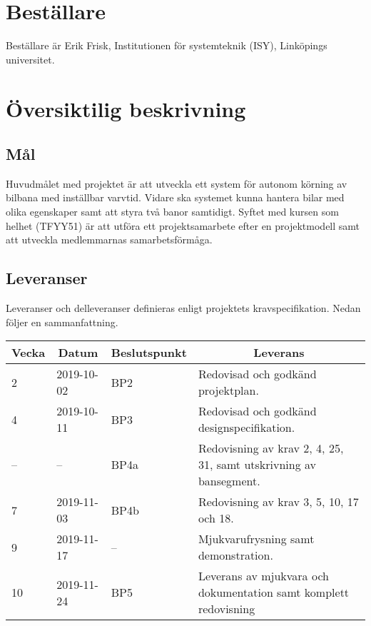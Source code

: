 \documentclass[10pt,swedish,oneside]{lips-no_customer}
\begin{document}
		\cleardoublepage
		\cfoot{\thepage}

    \section{Beställare} \label{sec:beställare}
		Beställare är Erik Frisk, Institutionen för systemteknik (ISY), Linköpings universitet.

    \section{Översiktilig beskrivning}
		\subsection{Mål}
		Huvudmålet med projektet är att utveckla ett system för autonom körning av bilbana med inställbar varvtid. Vidare ska systemet kunna hantera bilar med olika egenskaper samt att styra två banor samtidigt. Syftet med kursen som helhet (TFYY51) är att utföra ett projektsamarbete efter en projektmodell samt att utveckla medlemmarnas samarbetsförmåga.
		\subsection{Leveranser} \label{sec:leveranser}
		Leveranser och delleveranser definieras enligt projektets kravspecifikation. Nedan följer en sammanfattning. \\[1em]
		\begin{tabular}{|l|l|l|l|}
			\multicolumn{1}{c}{\bfseries Vecka} &
			\multicolumn{1}{|c}{\bfseries Datum} &
			\multicolumn{1}{|c}{\bfseries Beslutspunkt} &
			\multicolumn{1}{|c}{\bfseries Leverans} \\
			\hline
			\hline
			2 & 2019-10-02 & BP2 & Redovisad och godkänd projektplan. \\
			\hline
			4 & 2019-10-11  & BP3 & Redovisad och godkänd designspecifikation. \\
			\hline
			-- & -- & BP4a & Redovisning av krav 2, 4, 25, 31, samt utskrivning av bansegment. \\
			\hline
			7 & 2019-11-03 & BP4b & Redovisning av krav 3, 5, 10, 17 och 18. \\
			\hline
			9 & 2019-11-17 & -- & Mjukvarufrysning samt demonstration. \\
			\hline
			10 & 2019-11-24 & BP5 & Leverans av mjukvara och dokumentation samt komplett redovisning \\
			\hline
		\end{tabular}
	
\end{document}
